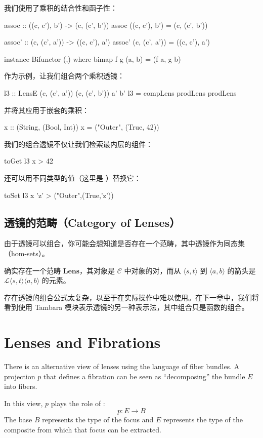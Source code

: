 \documentclass[DaoFP]{subfiles}
\begin{document}
 我们使用了乘积的结合性和函子性：
 \begin{haskell}
  assoc :: ((c, c'), b') -> (c, (c', b'))
  assoc ((c, c'), b') = (c, (c', b'))

  assoc' :: (c, (c', a')) -> ((c, c'), a')
  assoc' (c, (c', a')) = ((c, c'), a')

  instance Bifunctor (,) where
  bimap f g (a, b) = (f a, g b)
 \end{haskell}

 作为示例，让我们组合两个乘积透镜：
 \begin{haskell}
  l3 :: LensE (c, (c', a')) (c, (c', b')) a' b'
  l3 = compLens prodLens prodLens
 \end{haskell}
 并将其应用于嵌套的乘积：
 \begin{haskell}
  x :: (String, (Bool, Int))
  x = ("Outer", (True, 42))
 \end{haskell}
 我们的组合透镜不仅让我们检索最内层的组件：
 \begin{haskell}
  toGet l3 x
  > 42
 \end{haskell}
 还可以用不同类型的值（这里是 ）替换它：
 \begin{haskell}
  toSet l3 x 'z'
  > ("Outer",(True,'z'))
 \end{haskell}

 \subsection{透镜的范畴（Category of Lenses）}

 由于透镜可以组合，你可能会想知道是否存在一个范畴，其中透镜作为同态集（hom-sets）。

 确实存在一个范畴 $\mathbf{Lens}$，其对象是 $\mathcal{C}$ 中对象的对，而从 $\langle s, t\rangle$ 到 $ \langle a, b \rangle$ 的箭头是 $\mathcal{L} \langle s, t\rangle \langle a, b \rangle$ 的元素。

 存在透镜的组合公式太复杂，以至于在实际操作中难以使用。在下一章中，我们将看到使用 Tambara 模块表示透镜的另一种表示法，其中组合只是函数的组合。

\section{Lenses and Fibrations}

There is an alternative view of lenses using the language of fiber bundles. A projection $p$ that defines a fibration can be seen as ``decomposing'' the bundle $E$ into fibers. 

In this view, $p$ plays the role of :
\[ p \colon E \to B \]
The base $B$ represents the type of the focus and $E$ represents the type of the composite from which that focus can be extracted.
\end{document}
